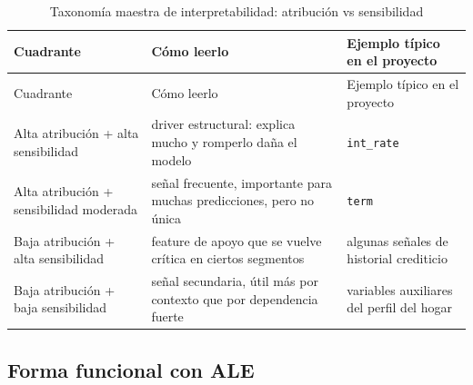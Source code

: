 \documentclass[
  spanish,
  11pt,
  letterpaper,
]{scrbook}
\theoremstyle{plain}
\theoremstyle{remark}
\begin{document}
\begin{longtable}[]{@{}
  >{\raggedright\arraybackslash}p{}
  >{\raggedright\arraybackslash}p{}
  >{\raggedright\arraybackslash}p{}@{}}
\caption{Taxonomía maestra de interpretabilidad: atribución vs
sensibilidad}\label{tbl-interpretability-taxonomy}\tabularnewline
\toprule\noalign{}
\begin{minipage}[b]{\linewidth}\raggedright
Cuadrante
\end{minipage} & \begin{minipage}[b]{\linewidth}\raggedright
Cómo leerlo
\end{minipage} & \begin{minipage}[b]{\linewidth}\raggedright
Ejemplo típico en el proyecto
\end{minipage} \\
\midrule\noalign{}
\endfirsthead
\toprule\noalign{}
\begin{minipage}[b]{\linewidth}\raggedright
Cuadrante
\end{minipage} & \begin{minipage}[b]{\linewidth}\raggedright
Cómo leerlo
\end{minipage} & \begin{minipage}[b]{\linewidth}\raggedright
Ejemplo típico en el proyecto
\end{minipage} \\
\midrule\noalign{}
\endhead
\bottomrule\noalign{}
\endlastfoot
Alta atribución + alta sensibilidad & driver estructural: explica mucho
y romperlo daña el modelo & \texttt{int\_rate} \\
Alta atribución + sensibilidad moderada & señal frecuente, importante
para muchas predicciones, pero no única & \texttt{term} \\
Baja atribución + alta sensibilidad & feature de apoyo que se vuelve
crítica en ciertos segmentos & algunas señales de historial
crediticio \\
Baja atribución + baja sensibilidad & señal secundaria, útil más por
contexto que por dependencia fuerte & variables auxiliares del perfil
del hogar \\
\end{longtable}

\subsection{Forma funcional con ALE}\label{forma-funcional-con-ale}
\end{document}

